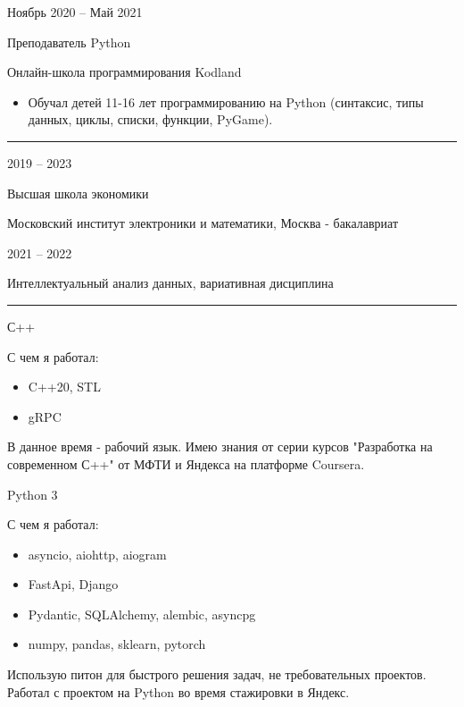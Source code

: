 \documentclass[a4paper,10pt]{article}
\newlength{\cvcolumngapwidth}
\newlength{\cvleftcolumnwidth}
\newlength{\cvrightcolumnwidth}
\newcommand{\cvsectionstyle}[1]{{\normalsize\cvsectionfont\textcolor{cvsectioncolor}{#1}}}
\newcommand{\cvtitlestyle}[1]{{\large\cvtitlefont\textcolor{cvtitlecolor}{#1}}}
\newcommand{\cvdurationstyle}[1]{{\small\cvdurationfont\textcolor{cvdurationcolor}{#1}}}
\newcommand{\cvheadingstyle}[1]{{\normalsize\cvheadingfont\textcolor{cvheadingcolor}{#1}}}
\newlength{\cvafteritemskipamount}
\newlength{\cvaftersectionskipamount}
\newlength{\cvbetweensectionandheadingextraskipamount}
\newlength{\cvaftertitleskipamount}
\newlength{\cvparskip}
\newcommand{\cvsection}[1]{
    \begin{minipage}[t]{\cvleftcolumnwidth}
        \raggedleft\cvsectionstyle{#1}
    \end{minipage}%
    \hspace{\cvcolumngapwidth}%
    \begin{minipage}[t]{\cvrightcolumnwidth}
        \textcolor{cvrulecolor}{\rule{\cvrightcolumnwidth}{0.3mm}}
    \end{minipage}

    \vspace{\cvaftersectionskipamount}
}
\newcommand{\cvitem}[2]{
    \begin{minipage}[t]{\cvleftcolumnwidth}
        \raggedleft #1
    \end{minipage}%
    \hspace{\cvcolumngapwidth}%
    \begin{minipage}[t]{\cvrightcolumnwidth}
        \setlength{\parskip}{\cvparskip} #2
    \end{minipage}

    \vspace{\cvafteritemskipamount}
}
\newcommand{\cvtitle}[1]{
    \cvtitlestyle{#1}

    \vspace{\cvaftertitleskipamount}
    \vspace{-\cvparskip}
}
\begin{document}
\cvitem{
    \cvdurationstyle{Ноябрь 2020 -- Май 2021}
}{
    \cvtitle{Преподаватель Python}

    Онлайн-школа программирования Kodland

    \begin{itemize}[leftmargin=*]
        \item Обучал детей 11-16 лет программированию на Python (синтаксис, типы данных, циклы, списки, функции, PyGame).
    \end{itemize}
}



\cvsection{Образование}

\cvitem{
    \cvdurationstyle{2019 -- 2023}
}{
    \cvtitle{Высшая школа экономики}

    Московский институт электроники и математики, Москва - бакалавриат
}

\cvitem{
    \cvdurationstyle{2021 -- 2022}
}{
    Интеллектуальный анализ данных, вариативная дисциплина

}


\cvsection{Навыки}

\vspace{\cvbetweensectionandheadingextraskipamount}

\cvitem{
    \cvheadingstyle{С++}
}{
    С чем я работал:
    \begin{itemize}
        \item C++20, STL
        \item gRPC
    \end{itemize}

    В данное время - рабочий язык. Имею знания от серии курсов "Разработка на современном С++" от МФТИ и Яндекса на платформе Coursera.
}

\cvitem{
    \cvheadingstyle{Python 3}
}{
    С чем я работал:
    \begin{itemize}
        \item asyncio, aiohttp, aiogram
        \item FastApi, Django
        \item Pydantic, SQLAlchemy, alembic, asyncpg
        \item numpy, pandas, sklearn, pytorch
    \end{itemize}

    Использую питон для быстрого решения задач, не требовательных проектов. Работал с проектом на Python во время стажировки в Яндекс.
}
\end{document}
